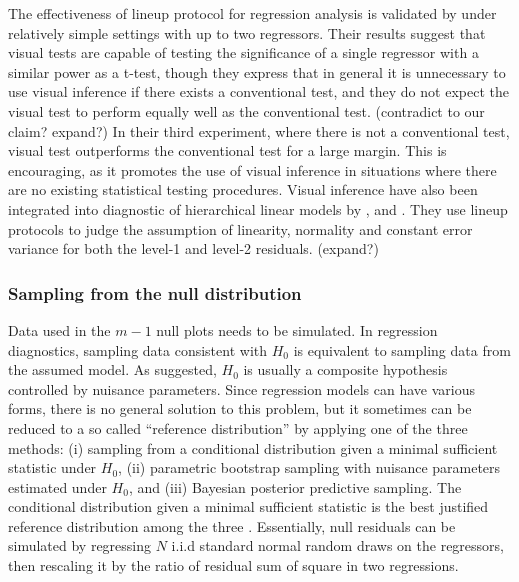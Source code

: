 \documentclass[]{interact}
\theoremstyle{plain}%
\theoremstyle{definition}
\theoremstyle{remark}
\begin{document}
The effectiveness of lineup protocol for regression analysis is
validated by \citet{majumder_validation_2013} under relatively simple
settings with up to two regressors. Their results suggest that visual
tests are capable of testing the significance of a single regressor with
a similar power as a t-test, though they express that in general it is
unnecessary to use visual inference if there exists a conventional test,
and they do not expect the visual test to perform equally well as the
conventional test. (contradict to our claim? expand?) In their third
experiment, where there is not a conventional test, visual test
outperforms the conventional test for a large margin. This is
encouraging, as it promotes the use of visual inference in situations
where there are no existing statistical testing procedures. Visual
inference have also been integrated into diagnostic of hierarchical
linear models by \citet{loy2013diagnostic}, \citet{loy2014hlmdiag} and
\citet{loy2015you}. They use lineup protocols to judge the assumption of
linearity, normality and constant error variance for both the level-1
and level-2 residuals. (expand?)

\hypertarget{sampling-from-the-null-distribution}{%
\subsubsection{Sampling from the null
distribution}\label{sampling-from-the-null-distribution}}

Data used in the \(m - 1\) null plots needs to be simulated. In
regression diagnostics, sampling data consistent with \(H_0\) is
equivalent to sampling data from the assumed model. As
\citet{buja_statistical_2009} suggested, \(H_0\) is usually a composite
hypothesis controlled by nuisance parameters. Since regression models
can have various forms, there is no general solution to this problem,
but it sometimes can be reduced to a so called ``reference
distribution'' by applying one of the three methods: (i) sampling from a
conditional distribution given a minimal sufficient statistic under
\(H_0\), (ii) parametric bootstrap sampling with nuisance parameters
estimated under \(H_0\), and (iii) Bayesian posterior predictive
sampling. The conditional distribution given a minimal sufficient
statistic is the best justified reference distribution among the three
\citep{buja_statistical_2009}. Essentially, null residuals can be
simulated by regressing \(N\) i.i.d standard normal random draws on the
regressors, then rescaling it by the ratio of residual sum of square in
two regressions.
\end{document}
